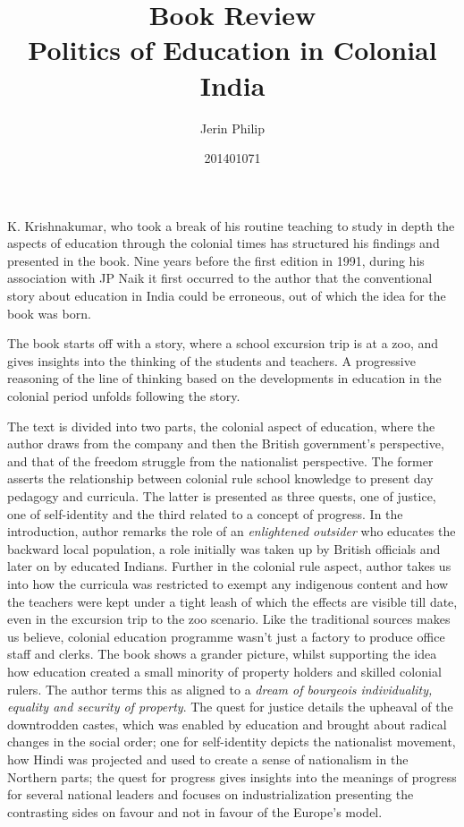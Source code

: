 \documentclass[a4paper]{article}
\title{Book Review\\ Politics of Education in Colonial India}
\author{Jerin Philip}
\date{201401071}
\begin{document}
\maketitle


    K. Krishnakumar, who took a break of his routine
    teaching to study in depth the aspects of education
    through the colonial times has structured his
    findings and presented in the book.  Nine years
    before the first edition in 1991, during his
    association with JP Naik it first occurred to the
    author that the conventional story about education
    in India could be erroneous, out of which the idea
    for the book was born.

    The book starts off with a story, where a school
    excursion trip is at a zoo, and gives insights into
    the thinking of the students and teachers. A
    progressive reasoning of the line of thinking based
    on the developments in education in the colonial
    period unfolds following the story.

    The text is divided into two parts, the colonial
    aspect of education, where the author draws from the
    company and then the British government's
    perspective, and that of the freedom struggle from
    the nationalist perspective. The former asserts the
    relationship between colonial rule school knowledge
    to present day pedagogy and curricula. The latter is
    presented as three quests, one of justice, one of
    self-identity and the third related to a concept of
    progress. In the introduction, author remarks the
    role of an \emph{enlightened outsider} who educates
    the backward local population, a role initially was
    taken up by British officials and later on by
    educated Indians. Further in the colonial rule
    aspect, author takes us into how the curricula was
    restricted to exempt any indigenous content and how
    the teachers were kept under a tight leash of which
    the effects are visible till date, even in the
    excursion trip to the zoo scenario. Like the
    traditional sources makes us believe, colonial
    education programme wasn't just a factory to produce
    office staff and clerks. The book shows a grander
    picture, whilst supporting the idea how education
    created  a small minority of property holders and
    skilled colonial rulers. The author terms this as
    aligned to a \emph{dream of bourgeois individuality,
    equality and security of property}. The quest for
    justice details the upheaval of the downtrodden
    castes, which was enabled by education and brought
    about radical changes in the social order; one for
    self-identity depicts the nationalist movement, how
    Hindi was projected and used to create a sense of
    nationalism in the Northern parts; the quest for
    progress gives insights into the meanings of
    progress for several national leaders and focuses
    on industrialization presenting the contrasting
    sides on favour and not in favour of the Europe's
    model.
\end{document}

